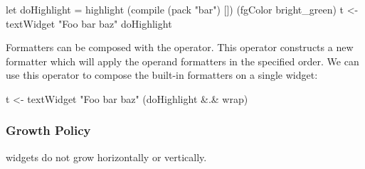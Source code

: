\begin{haskellcode}
 let doHighlight = highlight (compile (pack "bar") [])
                     (fgColor bright_green)
 t <- textWidget "Foo bar baz" doHighlight
\end{haskellcode}

Formatters can be composed with the  operator.  This
operator constructs a new formatter which will apply the operand
formatters in the specified order.  We can use this operator to
compose the built-in formatters on a single  widget:

\begin{haskellcode}
 t <- textWidget "Foo bar baz" (doHighlight &.& wrap)
\end{haskellcode}

\subsubsection{Growth Policy}

 widgets do not grow horizontally or vertically.
